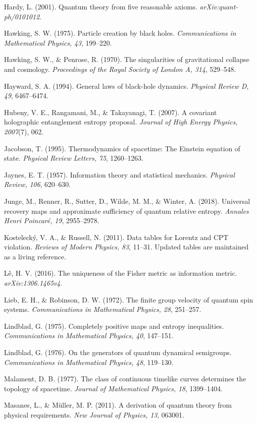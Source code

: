 \documentclass[
  11pt,
]{article}
\begin{document}
Hardy, L. (2001). Quantum theory from five reasonable axioms.
\emph{arXiv:quant-ph/0101012}.

Hawking, S. W. (1975). Particle creation by black holes.
\emph{Communications in Mathematical Physics, 43}, 199--220.

Hawking, S. W., \& Penrose, R. (1970). The singularities of
gravitational collapse and cosmology. \emph{Proceedings of the Royal
Society of London A, 314}, 529--548.

Hayward, S. A. (1994). General laws of black-hole dynamics.
\emph{Physical Review D, 49}, 6467--6474.

Hubeny, V. E., Rangamani, M., \& Takayanagi, T. (2007). A covariant
holographic entanglement entropy proposal. \emph{Journal of High Energy
Physics, 2007}(7), 062.

Jacobson, T. (1995). Thermodynamics of spacetime: The Einstein equation
of state. \emph{Physical Review Letters, 75}, 1260--1263.

Jaynes, E. T. (1957). Information theory and statistical mechanics.
\emph{Physical Review, 106}, 620--630.

Junge, M., Renner, R., Sutter, D., Wilde, M. M., \& Winter, A. (2018).
Universal recovery maps and approximate sufficiency of quantum relative
entropy. \emph{Annales Henri Poincaré, 19}, 2955--2978.

Kostelecký, V. A., \& Russell, N. (2011). Data tables for Lorentz and
CPT violation. \emph{Reviews of Modern Physics, 83}, 11--31. Updated
tables are maintained as a living reference.

Lê, H. V. (2016). The uniqueness of the Fisher metric as information
metric. \emph{arXiv:1306.1465v4}.

Lieb, E. H., \& Robinson, D. W. (1972). The finite group velocity of
quantum spin systems. \emph{Communications in Mathematical Physics, 28},
251--257.

Lindblad, G. (1975). Completely positive maps and entropy inequalities.
\emph{Communications in Mathematical Physics, 40}, 147--151.

Lindblad, G. (1976). On the generators of quantum dynamical semigroups.
\emph{Communications in Mathematical Physics, 48}, 119--130.

Malament, D. B. (1977). The class of continuous timelike curves
determines the topology of spacetime. \emph{Journal of Mathematical
Physics, 18}, 1399--1404.

Masanes, L., \& Müller, M. P. (2011). A derivation of quantum theory
from physical requirements. \emph{New Journal of Physics, 13}, 063001.
\end{document}
